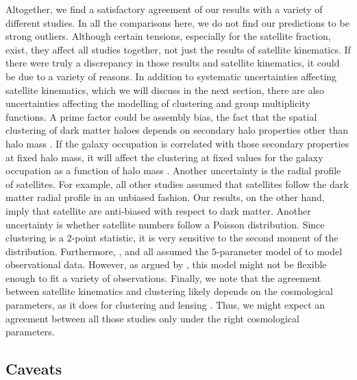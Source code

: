 \documentclass[fleqn,usenatbib,useAMS]{mnras}
\begin{document}
Altogether, we find a satisfactory agreement of our results with a variety of different studies. In all the comparisons here, we do not find our predictions to be strong outliers. Although certain tensions, especially for the satellite fraction, exist, they affect all studies together, not just the results of satellite kinematics. If there were truly a discrepancy in those results and satellite kinematics, it could be due to a variety of reasons. In addition to systematic uncertainties affecting satellite kinematics, which we will discuss in the next section, there are also uncertainties affecting the modelling of clustering and group multiplicity functions. A prime factor could be assembly bias, the fact that the spatial clustering of dark matter haloes depends on secondary halo properties other than halo mass \citep{Gao+05, Wechsler+06}. If the galaxy occupation is correlated with those secondary properties at fixed halo mass, it will affect the clustering at fixed values for the galaxy occupation as a function of halo mass \citep[see e.g.][]{Zentner+14, Hearin+16}. Another uncertainty is the radial profile of satellites. For example, all other studies assumed that satellites follow the dark matter radial profile in an unbiased fashion. Our results, on the other hand, imply that satellite are anti-biased with respect to dark matter. Another uncertainty is whether satellite numbers follow a Poisson distribution. Since clustering is a 2-point statistic, it is very sensitive to the second moment of the distribution. Furthermore, \cite{Guo+15b}, \cite{Vakili+16} and \cite{Sinha+17} all assumed the $5$-parameter model of \cite{Zheng+07} to model observational data. However, as argued by \cite{Sinha+17}, this model might not be flexible enough to fit a variety of observations. Finally, we note that the agreement between satellite kinematics and clustering likely depends on the cosmological parameters, as it does for clustering and lensing \citep{Cacciato+09, Cacciato+13}. Thus, we might expect an agreement between all those studies only under the right cosmological parameters.

\subsection{Caveats}
\end{document}

